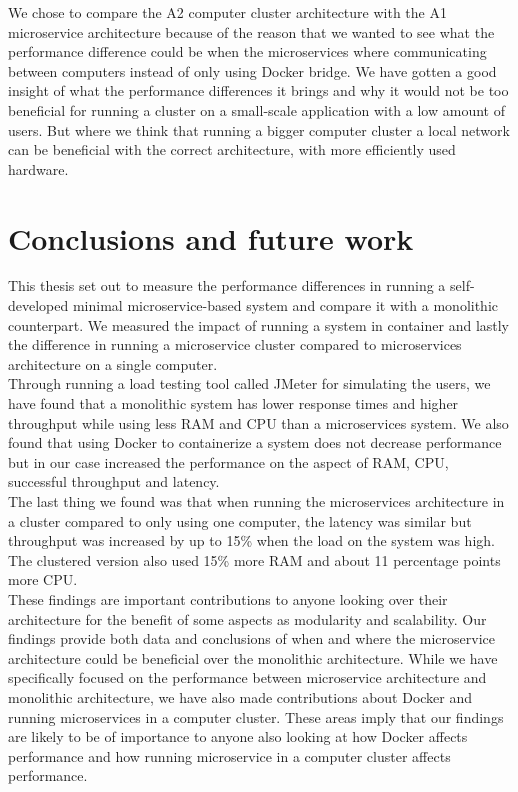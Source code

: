 \documentclass[a4paper,oneside]{bth}
\begin{document}
\par\vspace{0.5cm}
We chose to compare the A2 computer cluster architecture with the A1 microservice architecture because of the reason that we wanted to see what the performance difference could be when the microservices where communicating between computers instead of only using Docker bridge. We have gotten a good insight of what the performance differences it brings and why it would not be too beneficial for running a cluster on a small-scale application with a low amount of users. But where we think that running a bigger computer cluster a local network can be beneficial with the correct architecture, with more efficiently used hardware.

\chapter{Conclusions and future work} \label{Conclusion}

This thesis set out to measure the performance differences in running a self-developed minimal microservice-based system and compare it with a monolithic counterpart. We measured the impact of running a system in container and lastly the difference in running a microservice cluster compared to microservices architecture on a single computer.\\

Through running a load testing tool called JMeter for simulating the users, we have found that a monolithic system has lower response times and higher throughput while using less RAM and CPU than a microservices system. We also found that using Docker to containerize a system does not decrease performance but in our case increased the performance on the aspect of RAM, CPU, successful throughput and latency.\\

The last thing we found was that when running the microservices architecture in a cluster compared to only using one computer, the latency was similar but throughput was increased by up to 15\% when the load on the system was high. The clustered version also used 15\% more RAM and about 11 percentage points more CPU.\\

These findings are important contributions to anyone looking over their architecture for the benefit of some aspects as modularity and scalability. Our findings provide both data and conclusions of when and where the microservice architecture could be beneficial over the monolithic architecture. While we have specifically focused on the performance between microservice architecture and monolithic architecture, we have also made contributions about Docker and running microservices in a computer cluster. These areas imply that our findings are likely to be of importance to anyone also looking at how Docker affects performance and how running microservice in a computer cluster affects performance. 
\end{document}
